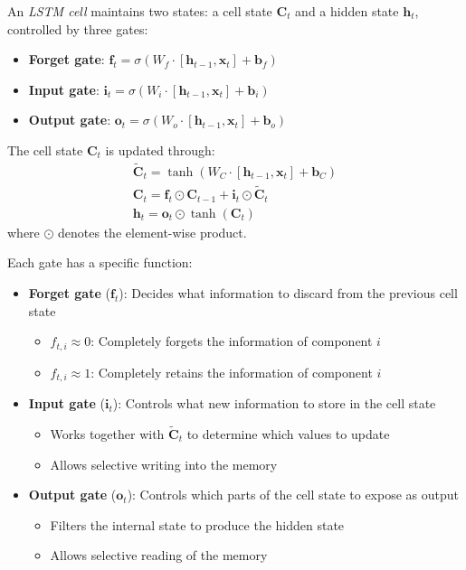 \begin{definition}\label{def:lstm_cell}
	An \textit{\gls{LSTM} cell} maintains two states: a cell state $\mathbf{C}_t$ and a hidden state $\mathbf{h}_t$, controlled by three gates:
	\begin{itemize}
		\item \textbf{Forget gate}: $\mathbf{f}_t = \sigma(W_f \cdot [\mathbf{h}_{t-1}, \mathbf{x}_t] + \mathbf{b}_f)$
		\item \textbf{Input gate}: $\mathbf{i}_t = \sigma(W_i \cdot [\mathbf{h}_{t-1}, \mathbf{x}_t] + \mathbf{b}_i)$
		\item \textbf{Output gate}: $\mathbf{o}_t = \sigma(W_o \cdot [\mathbf{h}_{t-1}, \mathbf{x}_t] + \mathbf{b}_o)$
	\end{itemize}
	The cell state $\mathbf{C}_t$ is updated through:
	\begin{gather*}
		\tilde{\mathbf{C}}_t = \tanh(W_C \cdot [\mathbf{h}_{t-1}, \mathbf{x}_t] + \mathbf{b}_C)\\
		\mathbf{C}_t = \mathbf{f}_t \odot \mathbf{C}_{t-1} + \mathbf{i}_t \odot \tilde{\mathbf{C}}_t\\
		\mathbf{h}_t = \mathbf{o}_t \odot \tanh(\mathbf{C}_t)
	\end{gather*}
	where $\odot$ denotes the element-wise product.
\end{definition}

Each gate has a specific function:

\begin{itemize}
	\item \textbf{Forget gate} ($\mathbf{f}_t$): Decides what information to discard from the previous cell state
	\begin{itemize}
		\item $f_{t,i} \approx 0$: Completely forgets the information of component $i$
		\item $f_{t,i} \approx 1$: Completely retains the information of component $i$
	\end{itemize}

	\item \textbf{Input gate} ($\mathbf{i}_t$): Controls what new information to store in the cell state
	\begin{itemize}
		\item Works together with $\tilde{\mathbf{C}}_t$ to determine which values to update
		\item Allows selective writing into the memory
	\end{itemize}

	\item \textbf{Output gate} ($\mathbf{o}_t$): Controls which parts of the cell state to expose as output
	\begin{itemize}
		\item Filters the internal state to produce the hidden state
		\item Allows selective reading of the memory
	\end{itemize}
\end{itemize}

